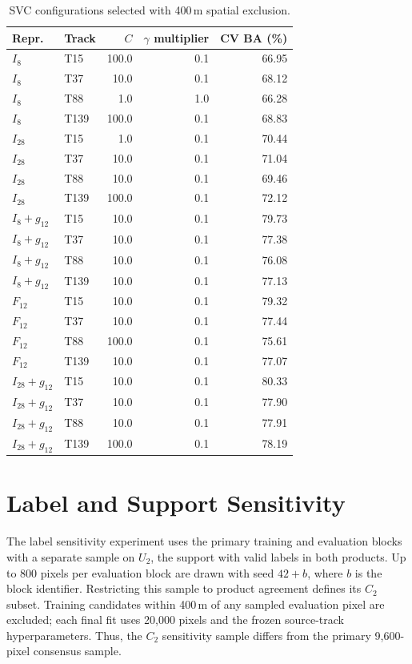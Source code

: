 \documentclass[journal]{IEEEtran}
\begin{document}
\begin{table}[!t]\centering\footnotesize
\caption{SVC configurations selected with 400\,m spatial exclusion.}\label{tab:hp_svc}
\setlength{\tabcolsep}{3pt}\begin{tabular}{llrrr}\toprule
Repr. & Track & $C$ & $\gamma$ multiplier & CV BA (\%) \\\midrule
$I_8$ & T15 & 100.0 & 0.1 & 66.95 \\
$I_8$ & T37 & 10.0 & 0.1 & 68.12 \\
$I_8$ & T88 & 1.0 & 1.0 & 66.28 \\
$I_8$ & T139 & 100.0 & 0.1 & 68.83 \\
$I_{28}$ & T15 & 1.0 & 0.1 & 70.44 \\
$I_{28}$ & T37 & 10.0 & 0.1 & 71.04 \\
$I_{28}$ & T88 & 10.0 & 0.1 & 69.46 \\
$I_{28}$ & T139 & 100.0 & 0.1 & 72.12 \\
$I_8+g_{12}$ & T15 & 10.0 & 0.1 & 79.73 \\
$I_8+g_{12}$ & T37 & 10.0 & 0.1 & 77.38 \\
$I_8+g_{12}$ & T88 & 10.0 & 0.1 & 76.08 \\
$I_8+g_{12}$ & T139 & 10.0 & 0.1 & 77.13 \\
$F_{12}$ & T15 & 10.0 & 0.1 & 79.32 \\
$F_{12}$ & T37 & 10.0 & 0.1 & 77.44 \\
$F_{12}$ & T88 & 100.0 & 0.1 & 75.61 \\
$F_{12}$ & T139 & 10.0 & 0.1 & 77.07 \\
$I_{28}+g_{12}$ & T15 & 10.0 & 0.1 & 80.33 \\
$I_{28}+g_{12}$ & T37 & 10.0 & 0.1 & 77.90 \\
$I_{28}+g_{12}$ & T88 & 10.0 & 0.1 & 77.91 \\
$I_{28}+g_{12}$ & T139 & 100.0 & 0.1 & 78.19 \\
\bottomrule\end{tabular}\end{table}
\section{Label and Support Sensitivity}
The label sensitivity experiment uses the primary training and evaluation blocks with a separate sample on $U_2$, the support with valid labels in both products. Up to 800 pixels per evaluation block are drawn with seed $42+b$, where $b$ is the block identifier. Restricting this sample to product agreement defines its $C_2$ subset. Training candidates within 400\,m of any sampled evaluation pixel are excluded; each final fit uses 20,000 pixels and the frozen source-track hyperparameters. Thus, the $C_2$ sensitivity sample differs from the primary 9,600-pixel consensus sample.
\end{document}
